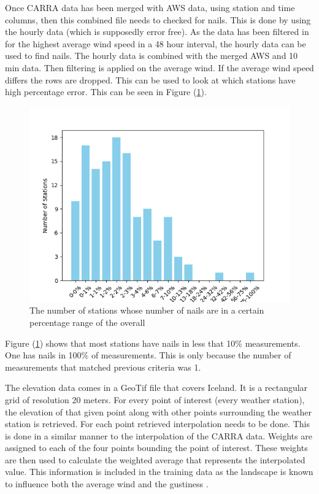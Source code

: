 Once CARRA data has been merged with AWS data, using station and time columns, then this combined file needs to checked for nails. This is done by using the hourly data (which is supposedly error free). As the data has been filtered in for the highest average wind speed in a 48 hour interval, the hourly data can be used to find nails. The hourly data is combined with the merged AWS and 10 min data. Then filtering is applied on the average wind. If the average wind speed differs the rows are dropped. This can be used to look at which stations have high percentage error. This can be seen in Figure (\ref{fig:error_count}).

\begin{figure}
    \caption{The number of stations whose number of nails are in a certain percentage range of the overall}
    \label{fig:error_count}
    \includegraphics[scale=0.75]{Figures/error_count.png}
\end{figure}

Figure (\ref{fig:error_count}) shows that most stations have nails in less that 10\% measurements. One has nails in 100\% of measurements. This is only because the number of measurements that matched previous criteria was 1.

The elevation data comes in a GeoTif file that covers Iceland. It is a rectangular grid of resolution 20 meters. For every point of interest (every weather station), the elevation of that given point along with other points surrounding the weather station is retrieved. For each point retrieved interpolation needs to be done. This is done in a similar manner to the interpolation of the CARRA data. Weights are assigned to each of the four points bounding the point of interest. These weights are then used to calculate the weighted average that represents the interpolated value. This information is included in the training data as the landscape is known to influence both the average wind and the gustiness \cite{GNP_vidtal}. 


